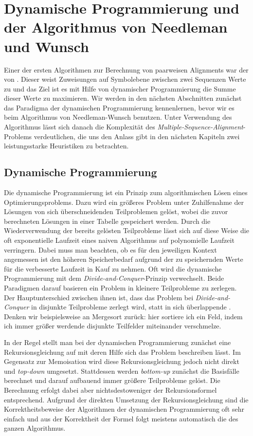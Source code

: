 \chapter{Dynamische Programmierung und der Algorithmus von Needleman und Wunsch}
\label{ch:Dynamische Programmierung}

Einer der ersten Algorithmen zur Berechnung von paarweisen Alignments war der von \cite{nw70}. Dieser weist Zuweisungen auf Symbolebene zwischen zwei Sequenzen Werte zu und das Ziel ist es mit Hilfe von dynamischer Programmierung die Summe dieser Werte zu maximieren. Wir werden in den nächsten Abschnitten zunächst das Paradigma der dynamischen Programmierung kennenlernen, bevor wir es beim Algorithmus von Needleman-Wunsch benutzen. Unter Verwendung des Algorithmus lässt sich danach die Komplexität des \emph{Multiple-Sequence-Alignment}-Problems verdeutlichen, die uns den Anlass gibt in den nächsten Kapiteln zwei leistungsstarke Heuristiken zu betrachten.

\section{Dynamische Programmierung}

Die dynamische Programmierung ist ein Prinzip zum algorithmischen Lösen eines Optimierungsproblems. Dazu wird ein größeres Problem unter Zuhilfenahme der Lösungen von sich überschneidenden Teilproblemen gelöst, wobei die zuvor berechneten Lösungen in einer Tabelle gespeichert werden. Durch die Wiederverwendung der bereits gelösten Teilprobleme lässt sich auf diese Weise die oft exponentielle Laufzeit eines naiven Algorithmus auf polynomielle Laufzeit verringern. Dabei muss man beachten, ob es für den jeweiligen Kontext angemessen ist den höheren Speicherbedarf aufgrund der zu speichernden Werte für die verbesserte Laufzeit in Kauf zu nehmen. Oft wird die dynamische Programmierung mit dem \emph{Divide-and-Conquer}-Prinzip verwechselt. Beide Paradigmen darauf basieren ein Problem in kleinere Teilprobleme zu zerlegen. Der Hauptunterschied zwischen ihnen ist, dass das Problem bei \emph{Divide-and-Conquer} in disjunkte Teilprobleme zerlegt wird, statt in sich überlappende \cite[S.359]{clrs09}. Denken wir beispielsweise an Mergesort zurück: hier sortiere ich ein Feld, indem ich immer größer werdende disjunkte Teilfelder miteinander verschmelze.

In der Regel stellt man bei der dynamischen Programmierung zunächst eine Rekursionsgleichung auf mit deren Hilfe sich das Problem beschreiben lässt. Im Gegensatz zur Memoisation wird diese Rekursionsgleichung jedoch nicht direkt und \emph{top-down} umgesetzt. Stattdessen werden \emph{bottom-up} zunächst die Basisfälle berechnet und darauf aufbauend immer größere Teilprobleme gelöst. Die Berechnung erfolgt dabei aber nichtsdestoweniger der Rekursionsformel entsprechend. Aufgrund der direkten Umsetzung der Rekursionsgleichung sind die Korrektheitsbeweise der Algorithmen der dynamischen Programmierung oft sehr einfach und aus der Korrektheit der Formel folgt meistens automatisch die des ganzen Algorithmus.

